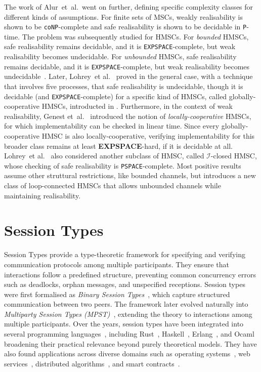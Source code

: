 The work of Alur~et~al.~went on further, defining specific complexity classes 
for different kinds of assumptions. For finite sets of MSCs,
weakly realisability is shown to be \verb|coNP|-complete and safe 
realisability is shown to be decidable in \verb|P|-time. The problem
was subsequently studied for HMSCs. For \emph{bounded} HMSCs, safe realisability 
remains decidable, and it is \verb|EXPSPACE|-complete, but weak realisability 
becomes undecidable. For \emph{unbounded} HMSCs, 
safe realisability remains decidable, and it is \verb|EXPSPACE|-complete, but weak realisability 
becomes undecidable~\cite{alur2005realizability}. 
Later, Lohrey~et al.~\cite{lohrey2003realizability} proved in the general case, 
with a technique that involves five processes, that safe realisability 
is undecidable, though it is decidable (and \verb|EXPSPACE|-complete) 
for a specific kind of HMSCs, called globally-cooperative HMSCs, introducted 
in \cite{morin2002recognizable}.
Furthermore, in the context of weak realisability,
Genest et~al.~\cite{genest2006infinite} introduced the notion of
\emph{locally-cooperative} HMSCs, for which implementability can be
checked in linear time.
Since every globally-cooperative HMSC is also locally-cooperative,
verifying implementability for this broader class remains at least
\textbf{EXPSPACE}-hard, if it is decidable at all.
Lohrey~et al.~\cite{lohrey2003realizability} also considered another subclass of HMSC,
called $\mathcal{I}$-closed HMSC, whose checking of safe realisability is \verb|PSPACE|-complete.
Most positive results assume other struttural restrictions, like bounded channels, 
but \cite{bollig2025high} introduces a new class of loop-connected HMSCs
that allows unbounded channels while maintaining realisability.

\section{Session Types}
Session Types provide a type-theoretic framework for specifying and verifying 
communication protocols among multiple participants.  
They ensure that interactions follow a predefined structure, 
preventing common concurrency errors such as deadlocks, orphan messages, 
and unspecified receptions. 
Session types were first formalised as 
\emph{Binary Session Types}~\cite{honda1993types}, 
which capture structured communication between two peers.  
The framework later evolved naturally into 
\emph{Multiparty Session Types (MPST)}~\cite{honda2008multiparty}, 
extending the theory to interactions among multiple participants.  
Over the years, session types have been integrated into several programming 
languages~\cite{DBLP:journals/ftpl/AnconaBB0CDGGGH16}, including 
Rust~\cite{jespersen2015session,chen2020ferrite}, 
Haskell~\cite{lindley2016embedding}, 
Erlang~\cite{mostrous2011session}, and
Ocaml~\cite{padovani2017simple}
broadening their practical relevance beyond purely theoretical models.  
They have also found applications across diverse domains such as 
operating systems~\cite{fahndrich2006language}, 
web services~\cite{yoshida2013scribble}, 
distributed algorithms~\cite{kouzapas2024session}, 
and smart contracts~\cite{das2021resource}.  

